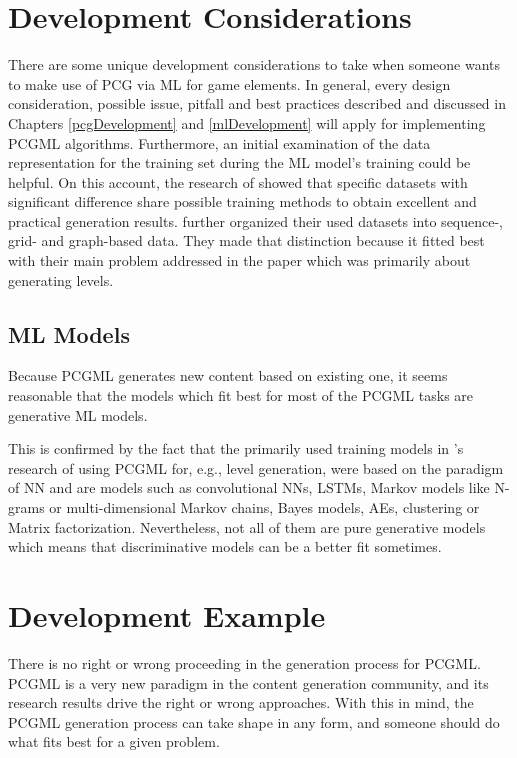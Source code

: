\documentclass[MGS,Master,english]{twbook}%
\begin{document}
\section{Development Considerations} \label{PCGML::devConsiderations}
There are some unique development considerations to take when someone wants to make use of \ac{PCG} via \ac{ML} for game elements. In general, every design consideration, possible issue, pitfall and best practices described and discussed in Chapters \ref{pcgDevelopment} and \ref{mlDevelopment} will apply for implementing \ac{PCGML} algorithms. Furthermore, an initial examination of the data representation for the training set during the \ac{ML} model’s training could be helpful. On this account, the research of \citep{pcgml::paper} showed that specific datasets with significant difference share possible training methods to obtain excellent and practical generation results. \citep{pcgml::paper} further organized their used datasets into sequence-, grid- and graph-based data. They made that distinction because it fitted best with their main problem addressed in the paper which was primarily about generating levels.

\subsection{\acl{ML} Models}
Because \ac{PCGML} generates new content based on existing one, it seems reasonable that the models which fit best for most of the \ac{PCGML} tasks are generative \ac{ML} models.

This is confirmed by the fact that the primarily used training models in 's research of using \ac{PCGML} for, e.g., level generation, were based on the paradigm of \ac{NN} and are models such as convolutional \acp{NN}, \acp{LSTM}, Markov models like N-grams or multi-dimensional Markov chains, Bayes models, \acp{AE}, clustering or Matrix factorization. Nevertheless, not all of them are pure generative models which means that discriminative models can be a better fit sometimes.

\section{Development Example} \label{PCGML::devExample}
There is no right or wrong proceeding in the generation process for \ac{PCGML}. \ac{PCGML} is a very new paradigm in the content generation community, and its research results drive the right or wrong approaches. With this in mind, the \ac{PCGML} generation process can take shape in any form, and someone should do what fits best for a given problem.
\end{document}
